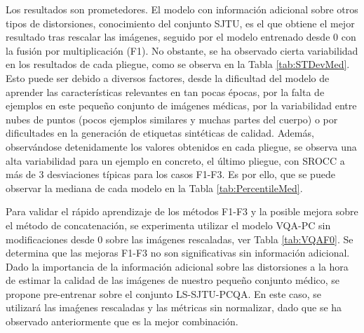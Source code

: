 Los resultados son prometedores. El modelo con información adicional sobre otros 
tipos de distorsiones, conocimiento del conjunto SJTU, es el que obtiene el mejor 
resultado tras rescalar las imágenes, seguido por el modelo entrenado desde 0 
con la fusión por multiplicación (F1). No obstante, se ha observado cierta 
variabilidad en los resultados de cada pliegue, como se observa en la Tabla \ref{tab:STDevMed}.
Esto puede ser debido a diversos factores, desde la dificultad del modelo de 
aprender las características relevantes en tan pocas épocas, por la falta 
de ejemplos en este pequeño conjunto de imágenes médicas, por la variabilidad 
entre nubes de puntos (pocos ejemplos similares y muchas partes del cuerpo) 
o por dificultades en la generación de etiquetas sintéticas de calidad. 
Además, observándose detenidamente los valores obtenidos en cada pliegue, 
se observa una alta variabilidad para un ejemplo en concreto, el último pliegue, 
con SROCC a más de 3 desviaciones típicas para los casos F1-F3.  Es por ello, 
que se puede observar la mediana de cada modelo en la Tabla \ref{tab:PercentileMed}.

Para validar el rápido aprendizaje de los métodos F1-F3 y la posible mejora 
sobre el método de concatenación, se experimenta utilizar el modelo VQA-PC sin 
modificaciones desde 0 sobre las imágenes rescaladas, ver Tabla \ref{tab:VQAF0}.
Se determina que las mejoras F1-F3 no son significativas sin información adicional. 
Dado la importancia de la información adicional sobre las distorsiones a la 
hora de estimar la calidad de las imágenes de nuestro pequeño conjunto médico, 
se propone pre-entrenar sobre el conjunto LS-SJTU-PCQA\cite{ResSCNN}.
En este caso, se utilizará las imaǵenes rescaladas y las métricas sin normalizar, 
dado que se ha observado anteriormente que es la mejor combinación.

